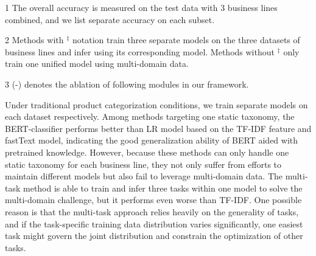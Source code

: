\begin{table}[!th]
\begin{threeparttable}[b]
\begin{tablenotes}
    \item[1] The overall accuracy is measured on the test data with 3 business lines combined, and we list separate accuracy on each subset.
    \item[2] Methods with $^{\ddagger}$ notation train three separate models on the three datasets of business lines and infer using its corresponding model. Methods without $^{\ddagger}$ only train one unified model using multi-domain data.
    \item[3] (-) denotes the ablation of following modules in our framework.
  \end{tablenotes}
  \end{threeparttable}
\end{table}

Under traditional product categorization conditions, we train separate models on each dataset respectively. 
Among methods targeting one static taxonomy, the BERT-classifier performs better than LR model based on the TF-IDF feature and fastText model, indicating the good generalization ability of BERT aided with pretrained knowledge. 
However, because these methods can only handle one static taxonomy for each business line, they not only suffer from efforts to maintain different models but also fail to leverage multi-domain data. 
The multi-task method is able to train and infer three tasks within one model to solve the multi-domain challenge, but it performs even worse than TF-IDF. 
One possible reason is that the multi-task approach relies heavily on the generality of tasks, and if the task-specific training data distribution varies significantly, one easiest task might govern the joint distribution and constrain the optimization of other tasks.


